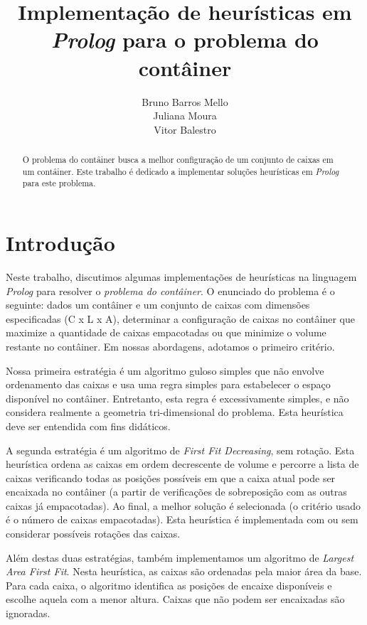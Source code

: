 \documentclass[12pt]{article}
\title{Implementação de heurísticas em \emph{Prolog} para o problema do contâiner}
\author{Bruno Barros Mello\inst{1} \\ Juliana Moura\inst{1} \\  Vitor
  Balestro\inst{1,2} }
\begin{document}
\maketitle

\begin{abstract} O problema do contâiner busca a melhor configuração de um conjunto de caixas em um contâiner. Este trabalho é dedicado a implementar soluções heurísticas em \emph{Prolog} para este problema.

\end{abstract}


\section{Introdução}

Neste trabalho, discutimos algumas implementações de heurísticas na linguagem \emph{Prolog} para resolver o \emph{problema do contâiner}. O enunciado do problema é o seguinte: dados um contâiner e um conjunto de caixas com dimensões especificadas (C x L x A), determinar a configuração de caixas no contâiner que maximize a quantidade de caixas empacotadas ou que minimize o volume restante no contâiner. Em nossas abordagens, adotamos o primeiro critério.

Nossa primeira estratégia é um algoritmo guloso simples que não envolve ordenamento das caixas e usa uma regra simples para estabelecer o espaço disponível no contâiner. Entretanto, esta regra é excessivamente simples, e não considera realmente a geometria tri-dimensional do problema. Esta heurística deve ser entendida com fins didáticos.

A segunda estratégia é um algoritmo de \emph{First Fit Decreasing}, sem rotação. Esta heurística ordena as caixas em ordem decrescente de volume e percorre a lista de caixas verificando todas as posições possíveis em que a caixa atual pode ser encaixada no contâiner (a partir de verificações de sobreposição com as outras caixas já empacotadas). Ao final, a melhor solução é selecionada (o critério usado é o número de caixas empacotadas). Esta heurística é implementada com ou sem considerar possíveis rotações das caixas.

Além destas duas estratégias, também implementamos um algoritmo de \emph{Largest Area First Fit}. Nesta heurística, as caixas são ordenadas pela maior área da base. Para cada caixa, o algoritmo identifica as posições de encaixe disponíveis e escolhe aquela com a menor altura. Caixas que não podem ser encaixadas são ignoradas.
\end{document}
